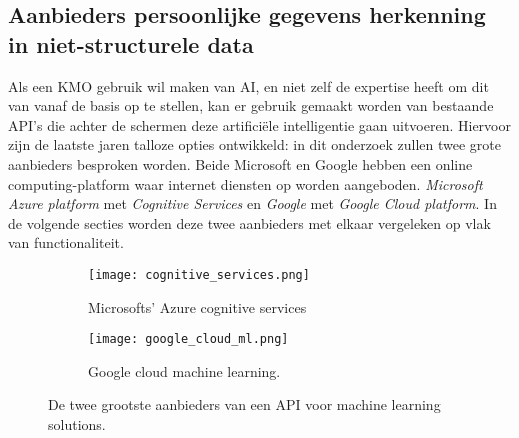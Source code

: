\subsection{Aanbieders persoonlijke gegevens herkenning in niet-structurele data}
Als een KMO gebruik wil maken van AI, en niet zelf de expertise heeft om dit van vanaf de basis op te stellen, kan er gebruik gemaakt worden van bestaande API's die achter de schermen deze artificiële intelligentie gaan uitvoeren. Hiervoor zijn de laatste jaren talloze opties ontwikkeld: in dit onderzoek zullen twee grote aanbieders besproken worden. Beide Microsoft en Google hebben een online computing-platform waar internet diensten op worden aangeboden. \textit{Microsoft Azure platform} met \textit{Cognitive Services} en  \textit{Google} met \textit{Google Cloud platform}. In de volgende secties worden deze twee aanbieders met elkaar vergeleken op vlak van functionaliteit.
 
\begin{figure}[h]
	\centering
	\begin{subfigure}{0.5\textwidth}
		\centering
		\texttt{[image: cognitive\_services.png]}
		\caption{Microsofts' Azure cognitive services}
		\label{fig:sub11}
	\end{subfigure}%
	\begin{subfigure}{0.5\textwidth}
		\centering
		\texttt{[image: google\_cloud\_ml.png]}
		\caption{Google cloud machine learning.}
		\label{fig:sub22}
	\end{subfigure}
	\caption{De twee grootste aanbieders van een API voor machine learning solutions.}
	\label{fig:test2}
\end{figure}

